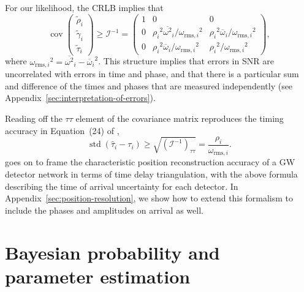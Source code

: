 \documentclass[amsmath,amssymb,aps,prx,reprint,nopreprintnumbers,nofootinbib]{revtex4-1}
\DeclareMathOperator{\cov}{cov}
\DeclareMathOperator{\std}{std}
\begin{document}
For our likelihood, the \ac{CRLB} implies that
%
\begin{equation}\label{eq:covariance-matrix}
    \cov{
        \left(
        \begin{array}{c}
            \tilde{\rho}_i \\
            \tilde{\gamma}_i \\
            \tilde{\tau}_i
        \end{array}
        \right)
    } \geq \mathcal{I}^{-1} = \left(
        \begin{array}{ccc}
            1 & 0 & 0 \\
            0 & {\rho_i}^2 {\overline{\omega^2}}_i/{\omega_{\mathrm{rms},i}}^2 & {\rho_i}^2 {\overline{\omega}}_i/{\omega_{\mathrm{rms},i}}^2 \\
            0 & {\rho_i}^2 {\overline{\omega}}_i/{\omega_{\mathrm{rms},i}}^2 & {\rho_i}^2/{\omega_{\mathrm{rms},i}}^2
        \end{array}
    \right),
\end{equation}
%
where ${\omega_{\mathrm{rms},i}}^2 = {\overline{\omega^2}}_i - {{\overline{\omega}}_i}^2$. This structure implies that errors in \ac{SNR} are uncorrelated with errors in time and phase, and that there is a particular sum and difference of the times and phases that are measured independently (see Appendix~\ref{sec:interpretation-of-errors}).

Reading off the $\tau \tau$ element of the covariance matrix reproduces the timing accuracy in Equation~(24) of \cite{FairhurstTriangulation},
%
\begin{equation}\label{eq:timing-crlb}
    \std \left(\hat{\tau}_i - \tau_i \right) \geq \sqrt{\left(\mathcal{I}^{-1}\right)_{\tau\tau}} = \frac{\rho_i}{\omega_{\mathrm{rms},i}}.
\end{equation}
%
\citet{FairhurstTriangulation} goes on to frame the characteristic position reconstruction accuracy of a \ac{GW} detector network in terms of time delay triangulation, with the above formula describing the time of arrival uncertainty for each detector. In Appendix~\ref{sec:position-resolution}, we show how to extend this formalism to include the phases and amplitudes on arrival as well.

\section{Bayesian probability and parameter estimation}
\label{sec:parameter-estimation}
\end{document}
